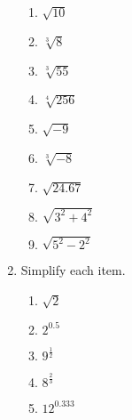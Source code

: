 \documentclass[12pt]{article}
\begin{document}
\begin{enumerate}
\begin{multicols}{2}
\begin{enumerate}
	\item \hspace{0.50in} $\sqrt{10}$
	\spacing

	\item \hspace{0.50in} $\sqrt[3]{8}$
	\spacing

	\item \hspace{0.50in} $\sqrt[3]{55}$
	\spacing

	\item \hspace{0.50in} $\sqrt[4]{256}$
	\spacing

	\item \hspace{0.50in} $\sqrt{-9}$
	\spacing

	\item \hspace{0.50in} $\sqrt[3]{-8}$
	\spacing

	\item \hspace{0.50in} $\sqrt{24.67}$
	\spacing

	\item \hspace{0.50in} $\sqrt{3^2+4^2}$
	\spacing

	\item \hspace{0.50in} $\sqrt{5^2-2^2}$
	\spacing

	\end{enumerate}
	\end{multicols}
	\spacing

\item Simplify each item. 
	\begin{multicols}{2}
	\begin{enumerate}
	\item \hspace{0.50in} $\sqrt{2}$
	\spacing

	\item \hspace{0.50in} $2^{0.5}$
  	\spacing

	\item \hspace{0.50in} $9^{\frac{1}{2}}$
	\spacing

	\item \hspace{0.50in} $8^{\frac{2}{3}}$
	\spacing

	\item \hspace{0.50in} $12^{0.333}$
	\spacing


\end{enumerate}
\end{multicols}
\end{enumerate}
\end{document}
